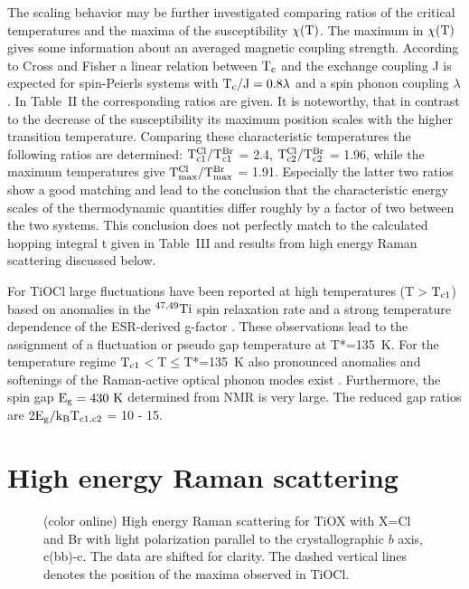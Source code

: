 \documentclass[prb,preprint,draft,amsmath,showpacs]{revtex4}
\begin{document}
The scaling behavior may be further investigated comparing ratios of the critical
temperatures and the maxima of the susceptibility $\rm \chi(T)$. The maximum in $\rm
\chi(T)$ gives some information about an averaged magnetic coupling strength. According
to Cross and Fisher \cite{cross79} a linear relation between $\rm T_c$ and the exchange
coupling J is expected for spin-Peierls systems with $\rm T_c/J=0.8\lambda$ and a spin
phonon coupling $\lambda$. In Table~II the corresponding ratios are given. It is
noteworthy, that in contrast to the decrease of the susceptibility its maximum position
scales with the higher transition temperature. Comparing these characteristic
temperatures the following ratios are determined: $\rm T_{c1}^{Cl}/T_{c1}^{Br}$ = 2.4,
$\rm T_{c2}^{Cl}/T_{c2}^{Br}$ = 1.96, while the maximum temperatures give $\rm
T_{max}^{Cl}/T_{max}^{Br}$ = 1.91. Especially the latter two ratios show a good matching
and lead to the conclusion that the characteristic energy scales of the thermodynamic
quantities differ roughly by a factor of two between the two systems. This conclusion
does not perfectly match to the calculated hopping integral t given in Table~III and
results from high energy Raman scattering discussed below.


For TiOCl large fluctuations have been reported at high temperatures (T$>$$\rm T_{c1}$)
based on anomalies in the $\rm ^{{47,49}}Ti$ spin relaxation rate and a strong
temperature dependence of the ESR-derived g-factor \cite{imai03,kataev03}. These
observations lead to the assignment of a fluctuation or pseudo gap temperature at
T*=135~K. For the temperature regime $\rm T_{c1}$$<$T$\leq$T*=135~K also pronounced
anomalies and softenings of the Raman-active optical phonon modes exist
\cite{lemmens03}. Furthermore, the spin gap $\rm E_g=430~K$ determined from NMR
\cite{imai03} is very large. The reduced gap ratios are $\rm 2E_g/k_BT_{c1,c2}$ = 10 -
15.

\section{High energy Raman scattering}

\begin{figure}[t]
      \begin{center}
       \leavevmode
       \epsfxsize=12cm 
        \caption{(color online) High energy Raman scattering for TiOX with
        X=Cl and Br with light polarization parallel to the crystallographic $b$ axis, c(bb)-c.
        The data are shifted for clarity. The dashed vertical lines denotes
        the position of the maxima observed in TiOCl.}
        \label{raman}
\end{center}
\end{figure}
\end{document}
